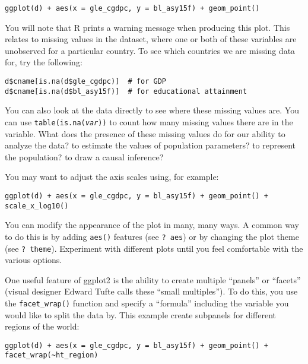\documentclass[a4paper,12pt]{article}
\begin{document}
\begin{enumerate*}
\begin{verbatim}
ggplot(d) + aes(x = gle_cgdpc, y = bl_asy15f) + geom_point()
\end{verbatim}

\item You will note that R prints a warning message when producing this plot. This relates to missing values in the dataset, where one or both of these variables are unobserved for a particular country. To see which countries we are missing data for, try the following:

\begin{verbatim}
d$cname[is.na(d$gle_cgdpc)]  # for GDP
d$cname[is.na(d$bl_asy15f)]  # for educational attainment
\end{verbatim}

\noindent You can also look at the data directly to see where these missing values are. You can use \texttt{table(is.na(\textit{var}))} to count how many missing values there are in the variable. What does the presence of these missing values do for our ability to analyze the data? to estimate the values of population parameters? to represent the population? to draw a causal inference?

\item You may want to adjust the axis scales using, for example:

\begin{verbatim}
ggplot(d) + aes(x = gle_cgdpc, y = bl_asy15f) + geom_point() + scale_x_log10()
\end{verbatim}

\item You can modify the appearance of the plot in many, many ways. A common way to do this is by adding \texttt{aes()} features (see \texttt{? aes}) or by changing the plot theme (see \texttt{? theme}). Experiment with different plots until you feel comfortable with the various options.

\item One useful feature of ggplot2 is the ability to create multiple ``panels'' or ``facets'' (visual designer Edward Tufte calls these ``small multiples''). To do this, you use the \texttt{facet\_wrap()} function and specify a ``formula'' including the variable you would like to split the data by. This example create subpanels for different regions of the world:

\begin{verbatim}
ggplot(d) + aes(x = gle_cgdpc, y = bl_asy15f) + geom_point() + facet_wrap(~ht_region)
\end{verbatim}


\end{enumerate*}
\end{document}
